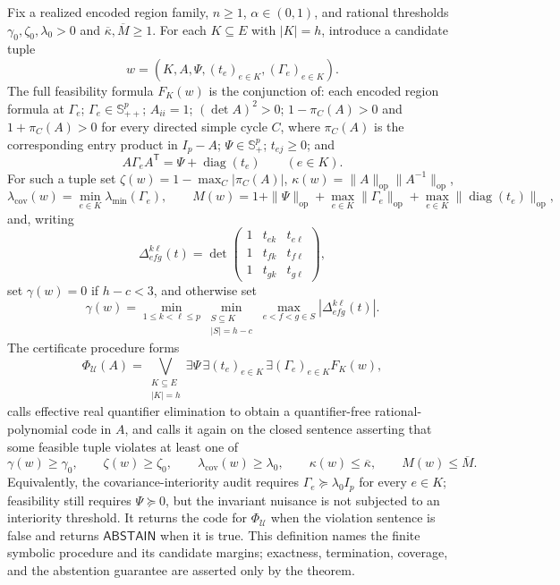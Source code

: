 Fix a realized encoded region family, \(n\geq1\), \(\alpha\in(0,1)\), and rational thresholds \(\gamma_0,\zeta_0,\lambda_0>0\) and \(\overline\kappa,\overline M\geq1\). For each \(K\subseteq E\) with \(|K|=h\), introduce a candidate tuple
\[
w=(K,A,\Psi,(t_e)_{e\in K},(\Gamma_e)_{e\in K}).
\]
The full feasibility formula \(F_K(w)\) is the conjunction of: each encoded region formula at \(\Gamma_e\); \(\Gamma_e\in\mathbb S_{++}^p\); \(A_{ii}=1\); \((\det A)^2>0\); \(1-\pi_C(A)>0\) and \(1+\pi_C(A)>0\) for every directed simple cycle \(C\), where \(\pi_C(A)\) is the corresponding entry product in \(I_p-A\); \(\Psi\in\mathbb S_+^p\); \(t_{ej}\geq0\); and
\[
A\Gamma_eA^{\mathsf T}=\Psi+\operatorname{diag}(t_e)
\qquad(e\in K).
\]
For such a tuple set \(\zeta(w)=1-\max_C|\pi_C(A)|\), \(\kappa(w)=\|A\|_{\mathrm{op}}\|A^{-1}\|_{\mathrm{op}}\),
\[
\lambda_{\mathrm{cov}}(w)=\min_{e\in K}\lambda_{\min}(\Gamma_e),
\qquad
M(w)=1+\|\Psi\|_{\mathrm{op}}+\max_{e\in K}\|\Gamma_e\|_{\mathrm{op}}+\max_{e\in K}\|\operatorname{diag}(t_e)\|_{\mathrm{op}},
\]
and, writing
\[
\Delta^{k\ell}_{efg}(t)=
\det\begin{pmatrix}
1&t_{ek}&t_{e\ell}\\
1&t_{fk}&t_{f\ell}\\
1&t_{gk}&t_{g\ell}
\end{pmatrix},
\]
set \(\gamma(w)=0\) if \(h-c<3\), and otherwise set
\[
\gamma(w)=
\min_{1\leq k<\ell\leq p}
\min_{\substack{S\subseteq K\\|S|=h-c}}
\max_{e<f<g\in S}|\Delta^{k\ell}_{efg}(t)|.
\]
The certificate procedure forms
\[
\Phi_{\mathcal U}(A)
=\bigvee_{\substack{K\subseteq E\\|K|=h}}
\exists\Psi\,\exists(t_e)_{e\in K}\,\exists(\Gamma_e)_{e\in K} F_K(w),
\]
calls effective real quantifier elimination to obtain a quantifier-free rational-polynomial code in \(A\), and calls it again on the closed sentence asserting that some feasible tuple violates at least one of
\[
\gamma(w)\geq\gamma_0,\qquad
\zeta(w)\geq\zeta_0,\qquad
\lambda_{\mathrm{cov}}(w)\geq\lambda_0,\qquad
\kappa(w)\leq\overline\kappa,\qquad
M(w)\leq\overline M.
\]
Equivalently, the covariance-interiority audit requires \(\Gamma_e\succeq\lambda_0I_p\) for every \(e\in K\); feasibility still requires \(\Psi\succeq0\), but the invariant nuisance is not subjected to an interiority threshold. It returns the code for \(\Phi_{\mathcal U}\) when the violation sentence is false and returns \(\mathsf{ABSTAIN}\) when it is true. This definition names the finite symbolic procedure and its candidate margins; exactness, termination, coverage, and the abstention guarantee are asserted only by the theorem.
